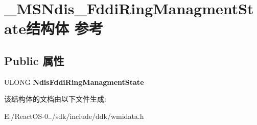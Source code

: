 \hypertarget{struct___m_s_ndis___fddi_ring_managment_state}{}\section{\+\_\+\+M\+S\+Ndis\+\_\+\+Fddi\+Ring\+Managment\+State结构体 参考}
\label{struct___m_s_ndis___fddi_ring_managment_state}
\subsection*{Public 属性}
\begin{DoxyCompactItemize}
\item 
\mbox{\label{struct___m_s_ndis___fddi_ring_managment_state_abd03860421c88674a7c404577a2f7bf8}} 
U\+L\+O\+NG {\bfseries Ndis\+Fddi\+Ring\+Managment\+State}
\end{DoxyCompactItemize}


该结构体的文档由以下文件生成\+:\begin{DoxyCompactItemize}
\item 
E\+:/\+React\+O\+S-\/0../sdk/include/ddk/wmidata.\+h\end{DoxyCompactItemize}
